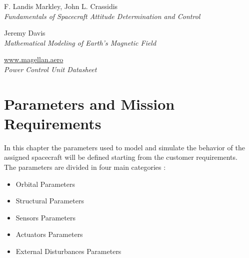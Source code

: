 \documentclass[11pt,a4paper]{report}
\begin{document}



\tableofcontents{}

\clearpage{}

\setcounter{page}{3}

\glsaddall
\glsdisablehyper
\printnoidxglossary[type=\acronymtype,title=Abbreviated Terms]

\nocite{*}
\renewcommand\bibname{Reference Books}
\begin{thebibliography}{0}
    F. Landis Markley, John L. Crassidis \\
    \textit{Fundamentals of Spacecraft Attitude Determination and Control}  
\end{thebibliography}

\renewcommand\bibname{Reference Articles}
\begin{thebibliography}{0}
\setcounter{enumiv}{1}
    Jeremy Davis\\
    \textit{Mathematical Modeling of Earth’s Magnetic Field}
\end{thebibliography}

\renewcommand\bibname{Datasheets \& User Manuals}
\renewcommand\UrlFont{\rmfamily}
\begin{thebibliography}{0}
\setcounter{enumiv}{3}
    \url{www.magellan.aero}\\
    \textit{Power Control Unit Datasheet} 
\end{thebibliography}


\chapter{Parameters and Mission Requirements}
In this chapter the parameters used to model and simulate the behavior of the assigned spacecraft will be defined starting from the customer requirements.\\
The parameters are divided in four main categories : 

\begin{itemize}
 \item Orbital Parameters
 \item Structural Parameters
 \item Sensors Parameters
 \item Actuators Parameters
 \item External Disturbances Parameters
\end{itemize}
\end{document}
